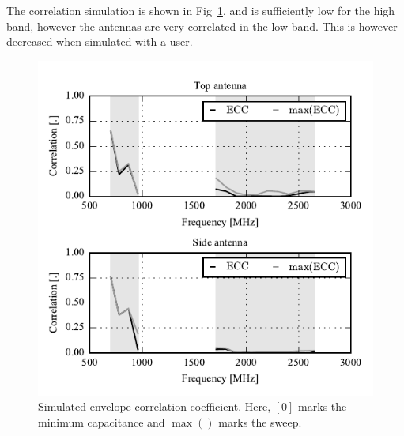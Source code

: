 The correlation simulation is shown in Fig~\ref{fig:sim_corr}, and is sufficiently low for the high band, however the antennas are very correlated in the low band. This is however decreased when simulated with a user. 
\begin{figure}[tb]
    \centering
    \includegraphics{img/sim/corr/correlation}
    \caption{Simulated envelope correlation coefficient. Here, $[0]$ marks the minimum capacitance and $\max()$ marks the sweep.}
    \label{fig:sim_corr}
\end{figure}


